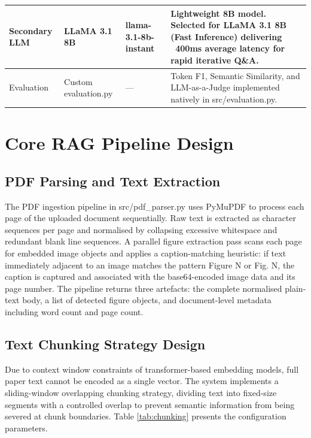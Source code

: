 \begin{table}[H]
\begin{tabular}{|p{2.5cm}|p{2.5cm}|p{1.5cm}|p{6cm}|}
\hline

Secondary LLM & LLaMA 3.1 8B & llama-3.1-8b-instant & Lightweight 8B model. Selected for LLaMA 3.1 8B (Fast Inference) delivering ~400ms average latency for rapid iterative Q\&A. \\

\hline

Evaluation & Custom evaluation.py & — & Token F1, Semantic Similarity, and LLM-as-a-Judge implemented natively in src/evaluation.py. \\

\hline

\end{tabular}

\end{table}

\section{Core RAG Pipeline Design}

\subsection{PDF Parsing and Text Extraction}

The PDF ingestion pipeline in src/pdf\_parser.py uses PyMuPDF to process each page of the uploaded document sequentially. Raw text is extracted as character sequences per page and normalised by collapsing excessive whitespace and redundant blank line sequences. A parallel figure extraction pass scans each page for embedded image objects and applies a caption-matching heuristic: if text immediately adjacent to an image matches the pattern Figure N or Fig. N, the caption is captured and associated with the base64-encoded image data and its page number. The pipeline returns three artefacts: the complete normalised plain-text body, a list of detected figure objects, and document-level metadata including word count and page count.

\subsection{Text Chunking Strategy Design}

Due to context window constraints of transformer-based embedding models, full paper text cannot be encoded as a single vector. The system implements a sliding-window overlapping chunking strategy, dividing text into fixed-size segments with a controlled overlap to prevent semantic information from being severed at chunk boundaries. Table \ref{tab:chunking} presents the configuration parameters.

